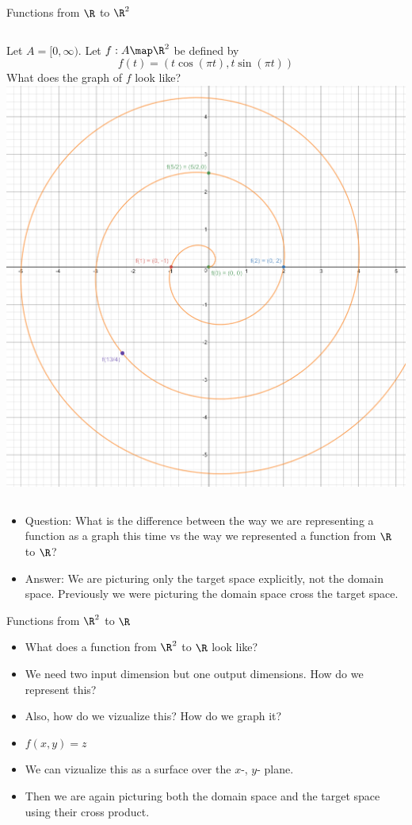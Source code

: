 \documentclass{beamer}
\begin{document}
\begin{frame}{Functions from $\R$ to $\R^2$}

\begin{columns}
\column[T]{5cm}
Let $A=[0, \infty)$. Let $f:A\map \R^2$ be defined by
$$f(t) = (t \cos(\pi t), t \sin(\pi t))$$
What does the graph of $f$ look like?
\column[T]{5cm}
\includegraphics[scale=0.1]{spiral}
\end{columns}

\begin{itemize}
\item Question: What is the difference between the way we are representing
a function as a graph this time vs the way we represented a function from
$\R$ to $\R$?
\item Answer: We are picturing only the target space explicitly, not
the domain space. Previously we were picturing the domain space cross
the target space.
\end{itemize}

\end{frame}

\begin{frame}{Functions from $\R^2$ to $\R$}

\begin{itemize}
\item What does a function from $\R^2$ to $\R$ look like?
\item We need two input dimension but one output dimensions.
How do we represent this?
\item Also, how do we vizualize this? How do we graph it?
\item $f(x,y) = z$
\item We can vizualize this as a surface over the $x$-, $y$- plane.
\item Then we are again picturing both the domain space and the target space
using their cross product.
\end{itemize}

\end{frame}
\end{document}
